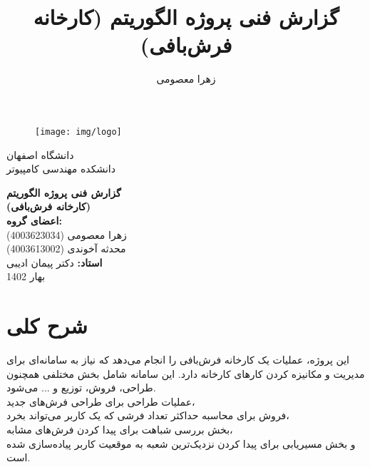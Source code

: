 \documentclass[12pt]{article}
\author{زهرا معصومی}
\title{گزارش فنی پروژه الگوریتم (کارخانه فرش‌بافی)}
\begin{document}
	\begin{figure}
		\centering
		\texttt{[image: img/logo]}
	\end{figure}
	\begin{center}
		دانشگاه اصفهان\\
		دانشکده مهندسی کامپیوتر
		\vspace{4\baselineskip}

		{\Huge \textbf{گزارش فنی پروژه الگوریتم }}\\

		\vspace{1\baselineskip}
		\textbf{(کارخانه فرش‌بافی)}\\
		\vspace{4\baselineskip}
		\textbf{اعضای گروه:}\\
		زهرا معصومی (4003623034) \\
		محدثه آخوندی (4003613002) \\


		\vspace{4\baselineskip}
		{\textbf{استاد:}}
		دکتر پیمان ادیبی\\
		\vspace{6\baselineskip}
		بهار 1402

	\end{center}

	\newpage
	\tableofcontents
	\listoffigures
	\newpage

	\section{شرح کلی}
	این پروژه،‌ عملیات یک کارخانه فرش‌بافی را انجام می‌دهد که نیاز به سامانه‌ای برای مدیریت و مکانیزه کردن کارهای کارخانه دارد. این سامانه شامل بخش مختلفی همچنون طراحی، فروش، توزیع و ... می‌شود.\\
	عملیات طراحی برای طراحی فرش‌های جدید،\\
	فروش برای محاسبه حداکثر تعداد فرشی که یک کاربر می‌تواند بخرد،\\
	بخش بررسی شباهت برای پیدا کردن فرش‌های مشابه،\\
	و بخش مسیریابی برای پیدا کردن نزدیک‌ترین شعبه به موقعیت کاربر پیاده‌سازی شده است.
\end{document}
